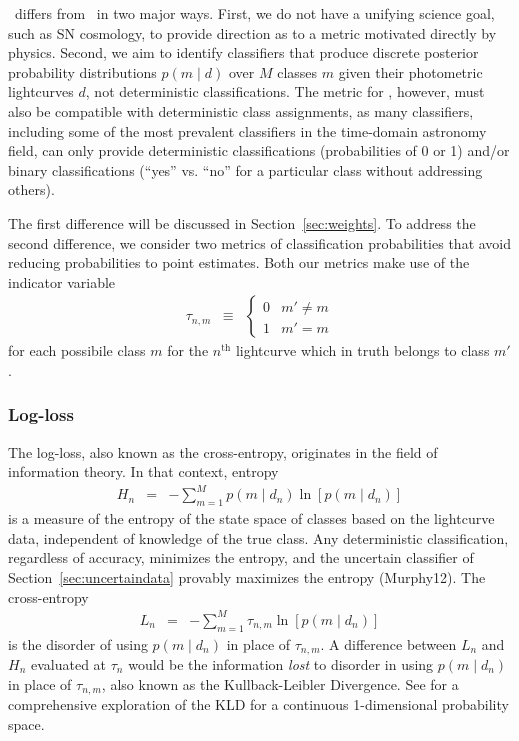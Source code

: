 \plasticc\ differs from \snphotcc\ in two major ways.
First, we do not have a unifying science goal, such as SN cosmology, to provide direction as to a metric motivated directly by physics.
Second, we aim to identify classifiers that produce discrete posterior probability distributions $p(m \mid d)$ over $M$ classes $m$ given their photometric lightcurves $d$, not deterministic classifications.
The metric for \plasticc, however, must also be compatible with deterministic class assignments, as many classifiers, including some of the most prevalent classifiers in the time-domain astronomy field, can only provide deterministic classifications (probabilities of 0 or 1) and/or binary classifications (``yes'' vs. ``no'' for a particular class without addressing others).

The first difference will be discussed in Section~\ref{sec:weights}.
To address the second difference, we consider two metrics of classification probabilities that avoid reducing probabilities to point estimates.
Both our metrics make use of the indicator variable
\begin{eqnarray}
  \label{eq:indicator}
  \tau_{n, m} &\equiv& \begin{cases}
  0 & m' \neq m\\
  1 & m' = m
  \end{cases}
\end{eqnarray}
for each possibile class $m$ for the $n^{\mathrm{th}}$ lightcurve which in truth belongs to class $m'$.

\subsubsection{Log-loss}
\label{sec:logloss}

The log-loss, also known as the cross-entropy, originates in the field of information theory.
In that context, entropy
\begin{eqnarray}
  \label{eq:entropy}
  H_{n} &=& -\sum_{m=1}^{M}p(m \mid d_{n})\ln[p(m \mid d_{n})]
\end{eqnarray}
is a measure of the entropy of the state space of classes based on the lightcurve data, independent of knowledge of the true class.
Any deterministic classification, regardless of accuracy, minimizes the entropy, and the uncertain classifier of Section~\ref{sec:uncertaindata} provably maximizes the entropy (Murphy12).
The cross-entropy
\begin{eqnarray}
  \label{eq:logloss}
  L_{n} &=& -\sum_{m=1}^{M}\tau_{n, m}\ln[p(m \mid d_{n})]
\end{eqnarray}
is the disorder of using $p(m \mid d_{n})$ in place of $\tau_{n, m}$.
A difference between $L_{n}$ and $H_{n}$ evaluated at $\tau_{n}$ would be the information \textit{lost} to disorder in using $p(m \mid d_{n})$ in place of $\tau_{n, m}$, also known as the Kullback-Leibler Divergence.
See \cite{2018AJ....156...35M} for a comprehensive exploration of the KLD for a continuous 1-dimensional probability space.

